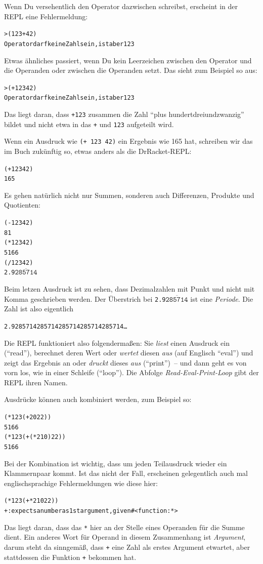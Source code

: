Wenn Du versehentlich den Operator dazwischen schreibst, erscheint
in der REPL eine Fehlermeldung:
%
\begin{alltt}
> ({\color{green}123} + {\color{green}42})
{\color{red}Operator darf keine Zahl sein, ist aber 123}
\end{alltt}
%
Etwas ähnliches passiert, wenn Du kein Leerzeichen zwischen den
Operator und die Operanden oder zwischen die Operanden setzt.  Das
sieht zum Beispiel so aus:
%
\begin{alltt}
> ({\color{green}+123} {\color{green}42})
{\color{red}Operator darf keine Zahl sein, ist aber 123}
\end{alltt}
%
Das liegt daran, dass \texttt{+123} zusammen die Zahl "`plus
hundertdreiundzwanzig"' bildet und nicht etwa in das \texttt{+} und
\texttt{123} aufgeteilt wird.

Wenn ein Ausdruck wie \texttt{(+ 123 42)} ein Ergebnis wie 165 hat,
schreiben wir das im Buch zukünftig so, etwas anders als die
DrRacket-REPL:
%
\begin{alltt}
(+ 123 42)
\evalsto{} 165
\end{alltt}
%
Es gehen natürlich nicht nur Summen, sonderen auch Differenzen,
Produkte und Quotienten:
%
\begin{alltt}
(- 123 42)
\evalsto{} 81
(* 123 42)
\evalsto{} 5166
(/ 123 42)
\evalsto{} 2.9\(\overline{\mathtt{285714}}\)
\end{alltt}
%
Beim letzen Ausdruck ist zu sehen, dass Dezimalzahlen mit Punkt und
nicht mit Komma geschrieben werden.  Der Überstrich bei
\texttt{2.9\(\overline{\mathtt{285714}}\)} ist eine
\textit{Periode}. Die Zahl ist also eigentlich
%
\begin{alltt}
2.9285714285714285714285714285714\ldots
\end{alltt}
%
Die REPL funktioniert also folgendermaßen: Sie \emph{liest} einen
Ausdruck ein ("`read"'), berechnet deren Wert oder \emph{wertet}
diesen \emph{aus} (auf Englisch "`eval"') und zeigt das Ergebnis an
oder \emph{druckt} dieses \emph{aus} ("`print"')~-- und dann geht es
von vorn los, wie in einer Schleife ("`loop"').  Die Abfolge
\emph{Read-Eval-Print-Loop} gibt der REPL ihren Namen.

Ausdrücke können auch kombiniert werden, zum Beispiel so:
%
\begin{alltt}
(* 123 (+ 20 22))
\evalsto{} 5166
(* 123 (+ (* 2 10) 22))
\evalsto{} 5166
\end{alltt}
%
Bei der Kombination ist wichtig, dass um jeden Teilausdruck wieder ein
Klammernpaar kommt.  Ist das nicht der Fall, erscheinen gelegentlich
auch mal englischsprachige Fehlermeldungen wie diese hier:
%
\begin{alltt}
(* 123 (+ * 2 10 22))
{\color{red}+: expects a number as 1st argument, given #<function:*>}
\end{alltt}
%
Das liegt daran, dass das \texttt{*} hier an der Stelle eines
Operanden für die Summe dient.  Ein anderes Wort für Operand in diesem
Zusammenhang ist \textit{Argument}, darum steht da sinngemäß, dass
\texttt{+} eine Zahl als erstes Argument etwartet, aber
stattdessen die Funktion \texttt{+} bekommen hat.

